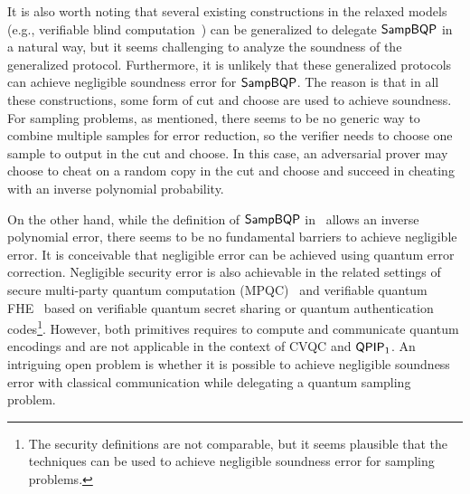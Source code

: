 

It is also worth noting that several existing constructions in the relaxed models (e.g., verifiable blind computation~\cite{FK17}) can be generalized to delegate $\operatorname{\mathsf{SampBQP}}$ in a natural way, but it seems challenging to analyze the soundness of the generalized protocol. Furthermore, it is unlikely that these generalized protocols can achieve negligible soundness error for $\operatorname{\mathsf{SampBQP}}$. The reason is that in all these constructions, some form of cut and choose are used to achieve soundness.
For sampling problems, as mentioned, there seems to be no generic way to combine multiple samples for error reduction, so the verifier needs to choose one sample to output in the cut and choose. In this case, an adversarial prover may choose to cheat on a random copy in the cut and choose and succeed in cheating with an inverse polynomial probability. 

On the other hand, while the definition of $\operatorname{\mathsf{SampBQP}}$ in~\cite{aaronson_2013, Boson} allows an inverse polynomial error, there seems to be no fundamental barriers to achieve negligible error. It is conceivable that negligible error can be achieved using quantum error correction. Negligible security error is also achievable in the related settings of secure multi-party quantum computation (MPQC)~\cite{CGS02,DNS12} and verifiable quantum FHE~\cite{ADSS17} based on verifiable quantum secret sharing or quantum authentication codes\footnote{The security definitions are not comparable, but it seems plausible that the techniques can be used to achieve negligible soundness error for sampling problems.}. However, both primitives requires to compute and communicate quantum encodings and are not applicable in the context of CVQC and $\operatorname{\mathsf{QPIP}}_1$. An intriguing open problem is whether it is possible to achieve negligible soundness error with classical communication while delegating a quantum sampling problem.




